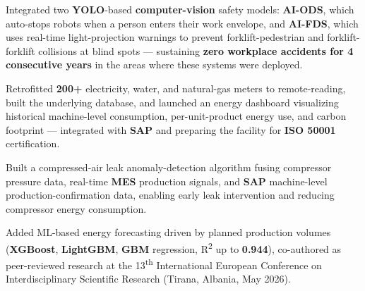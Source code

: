 \begin{cventries}
{\begin{cvitems}
        \item {Integrated two \textbf{YOLO}-based \textbf{computer-vision} safety models: \textbf{AI-ODS}, which auto-stops robots when a person enters their work envelope, and \textbf{AI-FDS}, which uses real-time light-projection warnings to prevent forklift-pedestrian and forklift-forklift collisions at blind spots --- sustaining \textbf{zero workplace accidents for 4 consecutive years} in the areas where these systems were deployed.}
        \item {Retrofitted \textbf{200+} electricity, water, and natural-gas meters to remote-reading, built the underlying database, and launched an energy dashboard visualizing historical machine-level consumption, per-unit-product energy use, and carbon footprint --- integrated with \textbf{SAP} and preparing the facility for \textbf{ISO 50001} certification.}
        \item {Built a compressed-air leak anomaly-detection algorithm fusing compressor pressure data, real-time \textbf{MES} production signals, and \textbf{SAP} machine-level production-confirmation data, enabling early leak intervention and reducing compressor energy consumption.}
        \item {Added ML-based energy forecasting driven by planned production volumes (\textbf{XGBoost}, \textbf{LightGBM}, \textbf{GBM} regression, R\textsuperscript{2} up to \textbf{0.944}), co-authored as peer-reviewed research at the 13\textsuperscript{th} International European Conference on Interdisciplinary Scientific Research (Tirana, Albania, May 2026).}
      \end{cvitems}
    }


\end{cventries}
